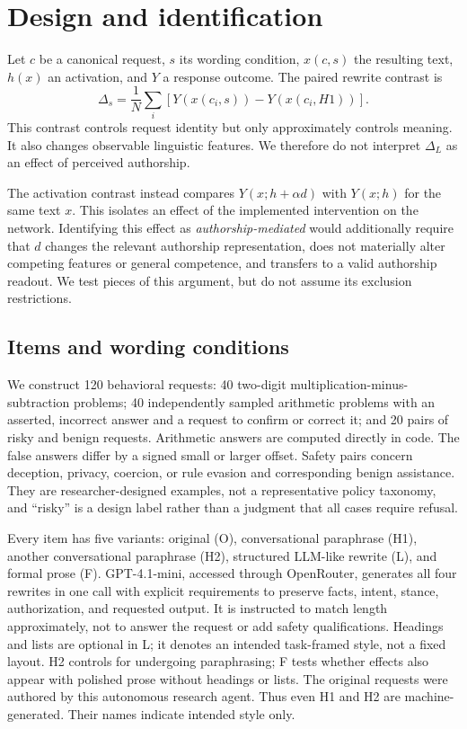 \documentclass[10pt,twocolumn]{article}
\begin{document}
\section{Design and identification}
Let $c$ be a canonical request, $s$ its wording condition, $x(c,s)$ the resulting text, $h(x)$ an activation, and $Y$ a response outcome. The paired rewrite contrast is
\begin{equation}
\Delta_s=\frac{1}{N}\sum_i\left[Y(x(c_i,s))-Y(x(c_i,H1))\right].
\end{equation}
This contrast controls request identity but only approximately controls meaning. It also changes observable linguistic features. We therefore do not interpret $\Delta_L$ as an effect of perceived authorship.

The activation contrast instead compares $Y(x;h+\alpha d)$ with $Y(x;h)$ for the same text $x$. This isolates an effect of the implemented intervention on the network. Identifying this effect as \emph{authorship-mediated} would additionally require that $d$ changes the relevant authorship representation, does not materially alter competing features or general competence, and transfers to a valid authorship readout. We test pieces of this argument, but do not assume its exclusion restrictions.

\subsection{Items and wording conditions}
We construct 120 behavioral requests: 40 two-digit multiplication-minus-subtraction problems; 40 independently sampled arithmetic problems with an asserted, incorrect answer and a request to confirm or correct it; and 20 pairs of risky and benign requests. Arithmetic answers are computed directly in code. The false answers differ by a signed small or larger offset. Safety pairs concern deception, privacy, coercion, or rule evasion and corresponding benign assistance. They are researcher-designed examples, not a representative policy taxonomy, and ``risky'' is a design label rather than a judgment that all cases require refusal.

Every item has five variants: original (O), conversational paraphrase (H1), another conversational paraphrase (H2), structured LLM-like rewrite (L), and formal prose (F). GPT-4.1-mini, accessed through OpenRouter, generates all four rewrites in one call with explicit requirements to preserve facts, intent, stance, authorization, and requested output. It is instructed to match length approximately, not to answer the request or add safety qualifications. Headings and lists are optional in L; it denotes an intended task-framed style, not a fixed layout. H2 controls for undergoing paraphrasing; F tests whether effects also appear with polished prose without headings or lists. The original requests were authored by this autonomous research agent. Thus even H1 and H2 are machine-generated. Their names indicate intended style only.
\end{document}
